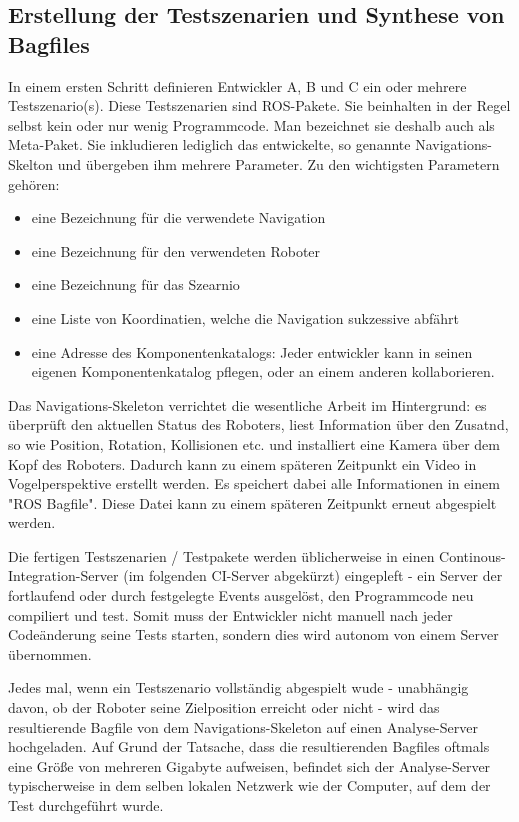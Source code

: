 \subsection{Erstellung der Testszenarien und Synthese von Bagfiles}
In einem ersten Schritt definieren Entwickler A, B und C ein oder mehrere Testszenario(s). Diese Testszenarien sind ROS-Pakete. Sie beinhalten in der Regel selbst kein oder nur wenig Programmcode. Man bezeichnet sie deshalb auch als Meta-Paket. Sie inkludieren lediglich das entwickelte, so genannte Navigations-Skelton und übergeben ihm mehrere Parameter. Zu den wichtigsten Parametern gehören:
\begin{itemize}
\item eine Bezeichnung für die verwendete Navigation
\item eine Bezeichnung für den verwendeten Roboter
\item eine Bezeichnung für das Szearnio
\item eine Liste von Koordinatien, welche die Navigation sukzessive abfährt
\item eine Adresse des Komponentenkatalogs: Jeder entwickler kann in seinen eigenen Komponentenkatalog pflegen, oder an einem anderen kollaborieren.
\end{itemize}
 Das Navigations-Skeleton verrichtet die wesentliche Arbeit im Hintergrund: es überprüft den aktuellen Status des Roboters, liest Information über den Zusatnd, so wie Position, Rotation, Kollisionen etc. und installiert eine Kamera über dem Kopf des Roboters. Dadurch kann zu einem späteren Zeitpunkt ein Video in Vogelperspektive erstellt werden. Es speichert dabei alle Informationen in einem "ROS Bagfile". Diese Datei kann zu einem späteren Zeitpunkt erneut abgespielt werden.

 Die fertigen Testszenarien / Testpakete werden üblicherweise in einen Continous-Integration-Server (im folgenden CI-Server abgekürzt) eingepleft - ein Server der fortlaufend oder durch festgelegte Events ausgelöst, den Programmcode neu compiliert und test. Somit muss der Entwickler nicht manuell nach jeder Codeänderung seine Tests starten, sondern dies wird autonom von einem Server übernommen.

Jedes mal, wenn ein Testszenario vollständig abgespielt wude - unabhängig davon, ob der Roboter seine Zielposition erreicht oder nicht - wird das resultierende Bagfile von dem Navigations-Skeleton auf einen Analyse-Server hochgeladen. Auf Grund der Tatsache, dass die resultierenden Bagfiles oftmals eine Größe von mehreren Gigabyte aufweisen, befindet sich der Analyse-Server typischerweise in dem selben lokalen Netzwerk wie der Computer, auf dem der Test durchgeführt wurde.


